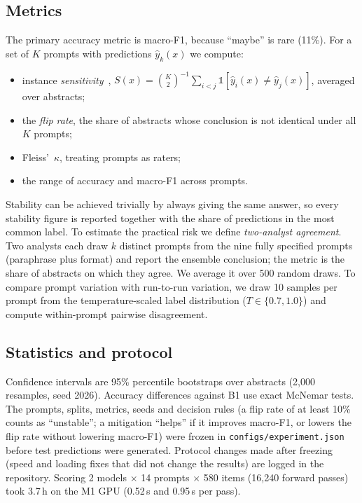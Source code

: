 \documentclass[acmsmall,nonacm]{acmart}
\begin{document}
\subsection{Metrics}
The primary accuracy metric is macro-F1, because ``maybe'' is rare (11\%). For a set of $K$ prompts with predictions $\hat{y}_k(x)$ we compute:
\begin{itemize}
  \item instance \emph{sensitivity}~\cite{errica2025sensitivity}, $S(x) = \binom{K}{2}^{-1} \sum_{i<j} \mathbb{1}[\hat{y}_i(x) \neq \hat{y}_j(x)]$, averaged over abstracts;
  \item the \emph{flip rate}, the share of abstracts whose conclusion is not identical under all $K$ prompts;
  \item Fleiss'~$\kappa$, treating prompts as raters;
  \item the range of accuracy and macro-F1 across prompts.
\end{itemize}
Stability can be achieved trivially by always giving the same answer, so every stability figure is reported together with the share of predictions in the most common label. To estimate the practical risk we define \emph{two-analyst agreement}. Two analysts each draw $k$ distinct prompts from the nine fully specified prompts (paraphrase plus format) and report the ensemble conclusion; the metric is the share of abstracts on which they agree. We average it over 500 random draws. To compare prompt variation with run-to-run variation, we draw 10 samples per prompt from the temperature-scaled label distribution ($T \in \{0.7, 1.0\}$) and compute within-prompt pairwise disagreement.

\subsection{Statistics and protocol}
Confidence intervals are 95\% percentile bootstraps over abstracts (2{,}000 resamples, seed 2026). Accuracy differences against B1 use exact McNemar tests. The prompts, splits, metrics, seeds and decision rules (a flip rate of at least 10\% counts as ``unstable''; a mitigation ``helps'' if it improves macro-F1, or lowers the flip rate without lowering macro-F1) were frozen in \texttt{configs/experiment.json} before test predictions were generated. Protocol changes made after freezing (speed and loading fixes that did not change the results) are logged in the repository. Scoring 2 models $\times$ 14 prompts $\times$ 580 items (16{,}240 forward passes) took 3.7\,h on the M1 GPU (0.52\,s and 0.95\,s per pass).





\end{document}
